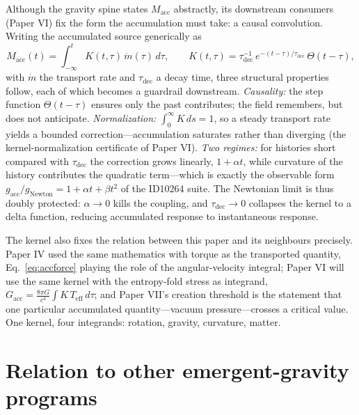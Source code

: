 \documentclass[11pt]{article}
\theoremstyle{remark}
\begin{document}
Although the gravity spine states $M_{\mathrm{acc}}$ abstractly, its downstream consumers (Paper VI) fix the form the accumulation must take: a causal convolution. Writing the accumulated source generically as
\begin{equation}
M_{\mathrm{acc}}(t) = \int_{-\infty}^{t} K(t, \tau)\, \dot{m}(\tau)\, d\tau, \qquad
K(t,\tau) = \tau_{\mathrm{dec}}^{-1}\, e^{-(t-\tau)/\tau_{\mathrm{dec}}}\, \Theta(t - \tau),
\label{eq:kernel}
\end{equation}
with $\dot{m}$ the transport rate and $\tau_{\mathrm{dec}}$ a decay time, three structural properties follow, each of which becomes a guardrail downstream. \emph{Causality:} the step function $\Theta(t-\tau)$ ensures only the past contributes; the field remembers, but does not anticipate. \emph{Normalization:} $\int_0^\infty K\, ds = 1$, so a steady transport rate yields a bounded correction---accumulation saturates rather than diverging (the kernel-normalization certificate of Paper VI). \emph{Two regimes:} for histories short compared with $\tau_{\mathrm{dec}}$ the correction grows linearly, $1 + \alpha t$, while curvature of the history contributes the quadratic term---which is exactly the observable form $g_{\mathrm{acc}}/g_{\mathrm{Newton}} = 1 + \alpha t + \beta t^2$ of the ID10264 suite. The Newtonian limit is thus doubly protected: $\alpha \to 0$ kills the coupling, and $\tau_{\mathrm{dec}} \to 0$ collapses the kernel to a delta function, reducing accumulated response to instantaneous response.

The kernel also fixes the relation between this paper and its neighbours precisely. Paper IV used the same mathematics with torque as the transported quantity, Eq.~\eqref{eq:accforce} playing the role of the angular-velocity integral; Paper VI will use the same kernel with the entropy-fold stress as integrand, $G_{\mathrm{acc}} = \frac{8\pi G}{c^4}\int K\, T_{\mathrm{eff}}\, d\tau$; and Paper VII's creation threshold is the statement that one particular accumulated quantity---vacuum pressure---crosses a critical value. One kernel, four integrands: rotation, gravity, curvature, matter.

\section{Relation to other emergent-gravity programs}
\label{sec:related}
\end{document}
